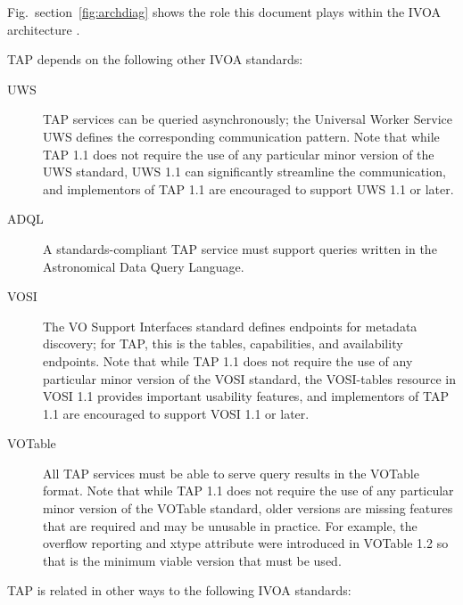 \documentclass[11pt,letter]{ivoa}
\begin{document}
Fig.~section~\ref{fig:archdiag} shows the role this document plays within the
IVOA architecture \citep{note:VOARCH}.

TAP depends on the following other IVOA standards:

\begin{description}

\item[UWS \citep{2016ivoa.spec.1024H}] TAP services can be queried
asynchronously; the Universal Worker Service UWS defines the
corresponding communication pattern.  Note that while TAP 1.1 does not
require the use of any particular minor version of the UWS standard, 
UWS 1.1 can significantly streamline the communication, and
implementors of TAP 1.1 are encouraged to support UWS 1.1 or later.

\item[ADQL \citep{2008ivoa.spec.1030O}] A standards-compliant TAP
service must support queries written in the Astronomical Data Query
Language.

\item[VOSI \citep{2017ivoa.spec.0524G}] The VO Support Interfaces standard
defines endpoints for metadata discovery; for TAP, this is the tables,
capabilities, and availability endpoints. Note that while TAP 1.1 does not
require the use of any particular minor version of the VOSI standard, 
the VOSI-tables resource in VOSI 1.1 provides important usability features, and
implementors of TAP 1.1 are encouraged to support VOSI 1.1 or later.

\item[VOTable \citep{2013ivoa.spec.0920O}] All TAP services must be able
to serve query results in the VOTable format. Note that while TAP 1.1 does not
require the use of any particular minor version of the VOTable standard, older 
versions are missing features that are required and may be unusable in practice.
For example, the overflow reporting and xtype attribute were introduced in 
VOTable 1.2 so that is the minimum viable version that must be used.
\end{description}


TAP is related in other ways to the following IVOA standards:
\end{document}
